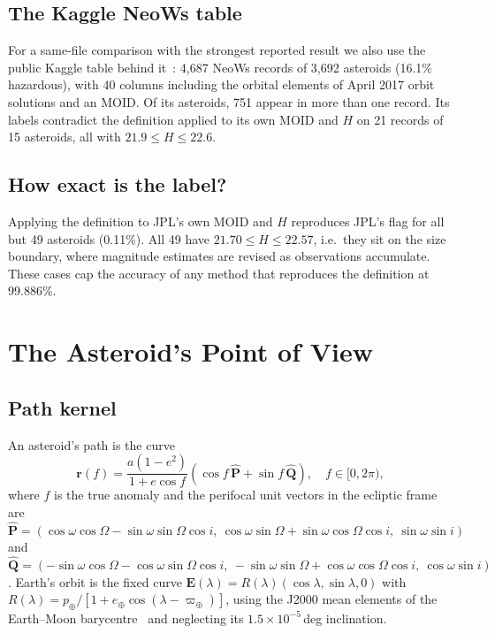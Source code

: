 \documentclass[conference]{IEEEtran}
\begin{document}
\subsection{The Kaggle NeoWs table}
For a same-file comparison with the strongest reported result we also use the public Kaggle table behind it~\cite{kaggle_nasa,chandra2025,malakouti2023}: 4,687 NeoWs records of 3,692 asteroids (16.1\% hazardous), with 40 columns including the orbital elements of April 2017 orbit solutions and an MOID. Of its asteroids, 751 appear in more than one record. Its labels contradict the definition applied to its own MOID and $H$ on 21 records of 15 asteroids, all with $21.9 \le H \le 22.6$.

\subsection{How exact is the label?}
Applying the definition to JPL's own MOID and $H$ reproduces JPL's flag for all but 49 asteroids (0.11\%). All 49 have $21.70 \le H \le 22.57$, i.e.\ they sit on the size boundary, where magnitude estimates are revised as observations accumulate. These cases cap the accuracy of any method that reproduces the definition at 99.886\%.

\section{The Asteroid's Point of View}

\subsection{Path kernel}
An asteroid's path is the curve
\begin{equation}
\mathbf{r}(f) = \frac{a(1-e^2)}{1+e\cos f}\left(\cos f\,\hat{\mathbf{P}} + \sin f\,\hat{\mathbf{Q}}\right), \quad f \in [0, 2\pi),
\label{eq:path}
\end{equation}
where $f$ is the true anomaly and the perifocal unit vectors in the ecliptic frame are
$\hat{\mathbf{P}} = (\cos\omega\cos\Omega - \sin\omega\sin\Omega\cos i,\ \cos\omega\sin\Omega + \sin\omega\cos\Omega\cos i,\ \sin\omega\sin i)$ and
$\hat{\mathbf{Q}} = (-\sin\omega\cos\Omega - \cos\omega\sin\Omega\cos i,\ -\sin\omega\sin\Omega + \cos\omega\cos\Omega\cos i,\ \cos\omega\sin i)$.
Earth's orbit is the fixed curve $\mathbf{E}(\lambda) = R(\lambda)(\cos\lambda, \sin\lambda, 0)$ with $R(\lambda) = p_\oplus/[1 + e_\oplus\cos(\lambda - \varpi_\oplus)]$, using the J2000 mean elements of the Earth--Moon barycentre~\cite{standish_approx} and neglecting its $1.5\times10^{-5}$\,deg inclination.
\end{document}
